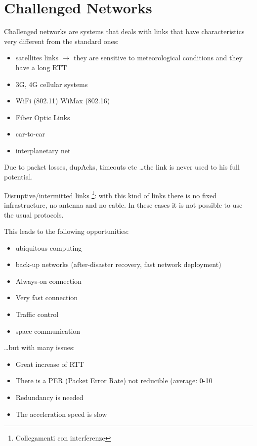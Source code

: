 \section{Challenged Networks}

Challenged networks are systems that deals with links that have
characteristics very different from the standard ones:

\begin{itemize}
  \item satellites links $\to$ they are sensitive to meteorological conditions
and they have a long RTT
  \item 3G, 4G cellular systems
  \item WiFi (802.11) WiMax (802.16)
  \item Fiber Optic Links
  \item car-to-car
  \item interplanetary net
\end{itemize}

Due to packet losses, dupAcks, timeouts etc \dots the link is never used
to his full potential.

Disruptive/intermitted links \footnote{Collegamenti con interferenze}: with
this kind of links there is no fixed infrastructure, no antenna and no cable.
In these cases it is not possible to use the usual protocols.

This leads to the following opportunities:
\begin{itemize}
  \item ubiquitous computing
  \item back-up networks (after-disaster recovery, fast network deployment)
  \item Always-on connection
  \item Very fast connection
  \item Traffic control
  \item space communication
\end{itemize}

\dots but with many issues:

\begin{itemize}
  \item Great increase of RTT
  \item There is a PER (Packet Error Rate) not reducible (average: 0-10%
  \item Redundancy is needed
  \item The acceleration speed is slow
\end{itemize}

